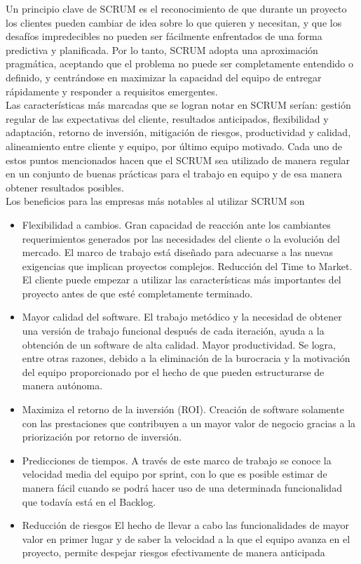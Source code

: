\documentclass[../pfc.tex]{subfiles}
\begin{document}
	Un principio clave de SCRUM es el reconocimiento de que durante un proyecto los clientes pueden cambiar de idea sobre lo que quieren y necesitan, y que los desafíos impredecibles no pueden ser fácilmente enfrentados de una forma predictiva y planificada. Por lo tanto, SCRUM adopta una aproximación pragmática, aceptando que el problema no puede ser completamente entendido o definido, y centrándose en maximizar la capacidad del equipo de entregar rápidamente y responder a requisitos emergentes.\\
	
	Las características más marcadas que se logran notar en SCRUM serían: gestión regular de las expectativas del cliente, resultados anticipados, flexibilidad y adaptación, retorno de inversión, mitigación de riesgos, productividad y calidad, alineamiento entre cliente y equipo, por último equipo motivado. Cada uno de estos puntos mencionados hacen que el SCRUM sea utilizado de manera regular en un conjunto de buenas prácticas para el trabajo en equipo y de esa manera obtener resultados posibles.\\
	
	Los beneficios para las empresas más notables al utilizar SCRUM son
	
	\begin{itemize} 
		\item Flexibilidad a cambios. Gran capacidad de reacción ante los cambiantes requerimientos generados por las necesidades del cliente o la evolución del mercado. El marco de trabajo está diseñado para adecuarse a las nuevas exigencias que implican proyectos complejos.
		Reducción del Time to Market. El cliente puede empezar a utilizar las características más importantes del proyecto antes de que esté completamente terminado. 
		\item Mayor calidad del software. El trabajo metódico y la necesidad de obtener una versión de trabajo funcional después de cada iteración, ayuda a la obtención de un software de alta calidad.
		Mayor productividad. Se logra, entre otras razones, debido a la eliminación de la burocracia y la motivación del equipo proporcionado por el hecho de que pueden estructurarse de manera autónoma.
		\item Maximiza el retorno de la inversión (ROI). Creación de software solamente con las prestaciones que contribuyen a un mayor valor de negocio gracias a la priorización por retorno de inversión.
		\item Predicciones de tiempos. A través de este marco de trabajo se conoce la velocidad media del equipo por sprint, con lo que es posible estimar de manera fácil cuando se podrá hacer uso de una determinada funcionalidad que todavía está en el Backlog.
		\item Reducción de riesgos El hecho de llevar a cabo las funcionalidades de mayor valor en primer lugar y de saber la velocidad a la que el equipo avanza en el proyecto, permite despejar riesgos efectivamente de manera anticipada
	\end{itemize}
	
\end{document}
